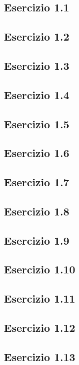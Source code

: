 \subsection{\textbf{Esercizio 1.1}}

\subsection{\textbf{Esercizio 1.2}}

\subsection{\textbf{Esercizio 1.3}}

\subsection{\textbf{Esercizio 1.4}}

\subsection{\textbf{Esercizio 1.5}}

\subsection{\textbf{Esercizio 1.6}}

\subsection{\textbf{Esercizio 1.7}}

\subsection{\textbf{Esercizio 1.8}}

\subsection{\textbf{Esercizio 1.9}}

\subsection{\textbf{Esercizio 1.10}}

\subsection{\textbf{Esercizio 1.11}}

\subsection{\textbf{Esercizio 1.12}}

\subsection{\textbf{Esercizio 1.13}}

